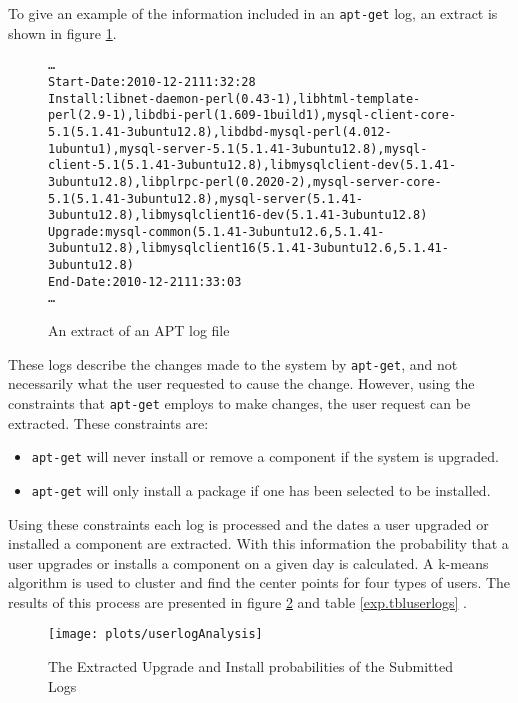 To give an example of the information included in an \texttt{apt-get} log, an extract is shown in figure \ref{aptlog}.
\begin{figure}[htp]
\begin{center}
\begin{alltt}
\ldots
Start-Date: 2010-12-21 11:32:28
Install: libnet-daemon-perl (0.43-1), libhtml-template-perl (2.9-1), libdbi-perl (1.609-1build1), mysql-client-core-5.1 (5.1.41-3ubuntu12.8), libdbd-mysql-perl (4.012-1ubuntu1), mysql-server-5.1 (5.1.41-3ubuntu12.8), mysql-client-5.1 (5.1.41-3ubuntu12.8), libmysqlclient-dev (5.1.41-3ubuntu12.8), libplrpc-perl (0.2020-2), mysql-server-core-5.1 (5.1.41-3ubuntu12.8), mysql-server (5.1.41-3ubuntu12.8), libmysqlclient16-dev (5.1.41-3ubuntu12.8)
Upgrade: mysql-common (5.1.41-3ubuntu12.6, 5.1.41-3ubuntu12.8), libmysqlclient16 (5.1.41-3ubuntu12.6, 5.1.41-3ubuntu12.8)
End-Date: 2010-12-21 11:33:03
\ldots
\end{alltt}
\caption[APT log extract]{An extract of an APT log file}
\label{aptlog}
\end{center}
\end{figure}

These logs describe the changes made to the system by \texttt{apt-get}, and not necessarily what the user requested to cause the change.
However, using the constraints that \texttt{apt-get} employs to make changes, the user request can be extracted.
These constraints are:
\begin{itemize}
  \item \texttt{apt-get} will never install or remove a component if the system is upgraded.
  \item \texttt{apt-get} will only install a package if one has been selected to be installed.
\end{itemize}
Using these constraints each log is processed and the dates a user upgraded or installed a component are extracted.
With this information the probability that a user upgrades or installs a component on a given day is calculated.
A k-means algorithm is used to cluster and find the center points for four types of users.
The results of this process are presented in figure \ref{exp.figuserlogs} and table \ref{exp.tbluserlogs} .

\begin{figure}[htp]
\begin{center}
  \texttt{[image: plots/userlogAnalysis]}
  \caption{The Extracted Upgrade and Install probabilities of the Submitted Logs}
  \label{exp.figuserlogs}
\end{center}
\end{figure}

